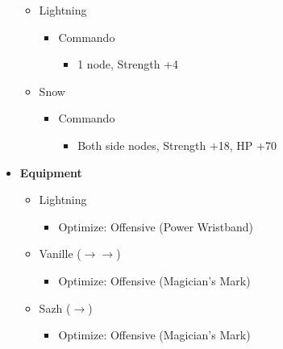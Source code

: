 \begin{paracol}{2}
\begin{menu}
\begin{itemize}
\begin{itemize}
				      \item Lightning
				            \begin{itemize}
					            \item Commando
					                  \begin{itemize}
						                  \item 1 node, Strength +4
					                  \end{itemize}
				            \end{itemize}
				      \item Snow
				            \begin{itemize}
					            \item Commando
					                  \begin{itemize}
						                  \item Both side nodes, Strength +18, HP +70
					                  \end{itemize}
				            \end{itemize}
			      \end{itemize}

			\item \textbf{Equipment}
			      \begin{itemize}
				      \item Lightning
				            \begin{itemize}
					            \item Optimize: Offensive (Power Wristband)
				            \end{itemize}
				      \item Vanille ($\rightarrow \rightarrow$)
				            \begin{itemize}
					            \item Optimize: Offensive (Magician's Mark)
				            \end{itemize}
				      \item Sazh ($\rightarrow$)
				            \begin{itemize}
					            \item Optimize: Offensive (Magician's Mark)
				            \end{itemize}
			      \end{itemize}
		\end{itemize}
	\end{menu}
	\renewcommand{\first}{[1] Tri-Disaster (\rav/\rav/\rav)}

	\renewcommand{\second}{[2] Solidarity (\com/\sen/\med)}


\end{paracol}
